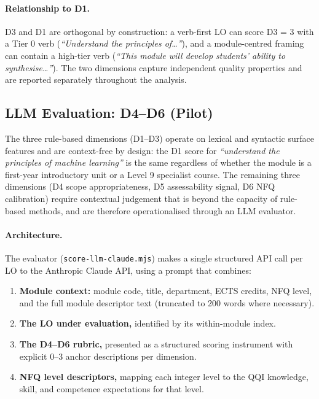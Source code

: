 \documentclass[12pt, a4paper]{article}
\begin{document}
\paragraph{Relationship to D1.}
D3 and D1 are orthogonal by construction: a verb-first LO can score D3 = 3 with a
Tier 0 verb (\textit{``Understand the principles of\ldots''}), and a module-centred
framing can contain a high-tier verb (\textit{``This module will develop students'
ability to synthesise\ldots''}). The two dimensions capture independent quality
properties and are reported separately throughout the analysis.

\subsection{LLM Evaluation: D4--D6 (Pilot)}
\label{sec:llm-eval}

The three rule-based dimensions (D1--D3) operate on lexical and syntactic surface
features and are context-free by design: the D1 score for \textit{``understand the
principles of machine learning''} is the same regardless of whether the module is
a first-year introductory unit or a Level 9 specialist course. The remaining three
dimensions (D4 scope appropriateness, D5 assessability signal, D6 NFQ calibration)
require contextual judgement that is beyond the capacity of rule-based methods,
and are therefore operationalised through an LLM evaluator.

\paragraph{Architecture.}
The evaluator (\texttt{score-llm-claude.mjs}) makes a single structured API call
per LO to the Anthropic Claude API, using a prompt that combines:

\begin{enumerate}
  \item \textbf{Module context:} module code, title, department, ECTS credits, NFQ level,
    and the full module descriptor text (truncated to 200 words where necessary).
  \item \textbf{The LO under evaluation,} identified by its within-module index.
  \item \textbf{The D4--D6 rubric,} presented as a structured scoring instrument with
    explicit 0--3 anchor descriptions per dimension.
  \item \textbf{NFQ level descriptors,} mapping each integer level to the QQI knowledge,
    skill, and competence expectations for that level.
\end{enumerate}
\end{document}
